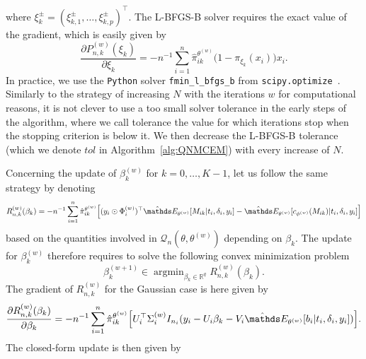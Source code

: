 \documentclass[11pt]{article}
\DeclareMathOperator{\argmin}{argmin}
\newcommand{\cQ}{\mathcal Q}
\newcommand{\R}{\mathds R}
\newcommand{\E}{\mathds E}
\begin{document}
where $\xi_k^\pm = (\xi_{k,1}^\pm, \ldots, \xi_{k,p}^\pm)^\top$. The L-BFGS-B solver requires the exact value of the gradient, which is easily given by
\begin{equation}
  \label{eq:grad-xi_k}
  \frac{\partial P_{n,k}^{(w)}(\xi_k)}{\partial \xi_k} = -n^{-1} \sum_{i=1}^n \hat \pi_{ik}^{\theta^{(w)}} \big( 1 - \pi_{\xi_k}(x_i) \big) x_i.
\end{equation}
In practice, we use the \texttt{Python} solver \texttt{fmin\_l\_bfgs\_b} from \texttt{scipy.optimize}~\citep{virtanen2020scipy}. Similarly to the strategy of increasing $N$ with the iterations $w$ for computational reasons, it is not clever to use a too small solver tolerance in the early steps of the algorithm, where we call tolerance the value for which iterations stop when the stopping criterion is below it. We then decrease the L-BFGS-B tolerance (which we denote $tol$ in Algorithm~\ref{alg:QNMCEM}) with every increase of $N$.

Concerning the update of $\beta_k^{(w)}$ for $k=0, \ldots, K-1$, let us follow the same strategy by denoting
\begin{equation*}
  R^{(w)}_{n,k}(\beta_k) = -n^{-1} \sum_{i=1}^n \hat \pi_{ik}^{\theta^{(w)}} \Big[ (y_i \odot \Phi_i^{(w)})^\top \hat \E_{\theta^{(w)}}[ M_{ik} | t_i, \delta_i, y_i] - \hat \E_{\theta^{(w)}}[ c_{\phi^{(w)}}(M_{ik}) | t_i, \delta_i, y_i] \Big]
\end{equation*}
based on the quantities involved in $\cQ_n(\theta, \theta^{(w)})$ depending on $\beta_k$. The update for $\beta_k^{(w)}$ therefore requires to solve the following convex minimization problem
\begin{equation}
  \label{eq:minimization-beta_k}
  \beta_k^{(w+1)} \in \argmin_{\beta_k \in \R^q} R^{(w)}_{n,k}(\beta_k).
\end{equation}
The gradient of $R_{n,k}^{(w)}$ for the Gaussian case is here given by
\begin{equation}
  \label{eq:grad-beta_k}
  \frac{\partial R_{n,k}^{(w)}(\beta_k)}{\partial \beta_k} = -n^{-1} \sum_{i=1}^n \hat \pi_{ik}^{\theta^{(w)}} \Big[ U_{i}^\top \Sigma_i^{(w)} I_{n_{i}} (y_i - U_{i}\beta_k - V_{i}\hat \E_{\theta^{(w)}}[ b_i | t_i, \delta_i, y_i])\Big].
\end{equation}
The closed-form update is then given by
\end{document}
